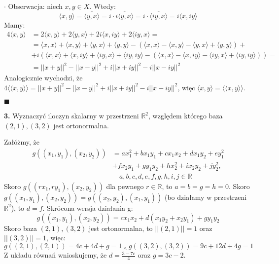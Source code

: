 \documentclass{article}
\begin{document}
$\cdot$ Obserwacja: niech $x,y\in X$. Wtedy: $$\langle x,y \rangle=\overline{\langle y,x \rangle}=i\cdot\overline{i\langle y,x\rangle}=i\cdot\overline{\langle iy,x\rangle}=i\langle x,iy\rangle$$
Mamy: 
\begin{align*}
    4\langle x,y \rangle &= 2\langle x,y \rangle + 2\langle y,x \rangle + 2i\langle x,iy \rangle + 2\langle iy,x \rangle = \\
    &= \langle x,x \rangle + \langle x,y \rangle +\langle y,x \rangle + \langle y,y \rangle -(\langle x,x \rangle - \langle x,y \rangle -\langle y,x \rangle + \langle y,y \rangle) +\\
    &+ i(\langle x,x \rangle + \langle x,iy \rangle +\langle iy,x \rangle + \langle iy,iy \rangle -(\langle x,x \rangle - \langle x,iy \rangle -\langle iy,x \rangle + \langle iy,iy \rangle)) =\\
    &= ||x+y||^2-||x-y||^2+i||x+iy||^2-i||x-iy||^2
\end{align*}
Analogicznie wychodzi, że $4\langle\langle x,y \rangle\rangle= ||x+y||^2-||x-y||^2+i||x+iy||^2-i||x-iy||^2$, więc $\langle x,y \rangle=\langle\langle x,y \rangle\rangle$.
\begin{flushright}
$\blacksquare$
\end{flushright}
\begin{center}
\large \textbf{3.}  Wyznaczyć iloczyn skalarny w przestrzeni $\mathds{R}^2$, względem którego baza $(2, 1),(3, 2)$ jest ortonormalna.
\end{center}
\normalsize{}
Załóżmy, że 
\begin{align*}
    g((x_1,y_1),(x_2,y_2))&=ax_1^2 + bx_1y_1 + cx_1x_2 + dx_1y_2 + ey_1^2 \\&+ fx_2y_1 + gy_1y_2 + hx_2^2 + ix_2y_2 + jy_2^2,\\&\quad a,b,c,d,e,f,g,h,i,j\in\mathds{R} 
\end{align*}
Skoro $g((rx_1,ry_1),(x_2,y_2))$ dla pewnego $r\in\mathds{R}$, to $a=b=g=h=0$.
Skoro $g((x_1,y_1),(x_2,y_2))=g((x_2,y_2),(x_1,y_1))$ (bo działamy w przestrzeni $\mathds{R}^2$), to $d=f$. Skrócona wersja działania g: $$g((x_1,y_1),(x_2,y_2))=cx_1x_2 + d(x_1y_2+x_2y_1) + gy_1y_2$$
Skoro baza $(2, 1),(3, 2)$ jest ortonormalna, to $||(2, 1)||=1$ oraz $||(3, 2)||=1$, więc:
$$g((2,1),(2,1))=4c+4d+g=1\ _\wedge\ g((3,2),(3,2))=9c+12d+4g=1$$
Z układu równań wnioskujemy, że $d=\frac{3-7c}{4}$ oraz $g=3c-2$.
\end{document}
